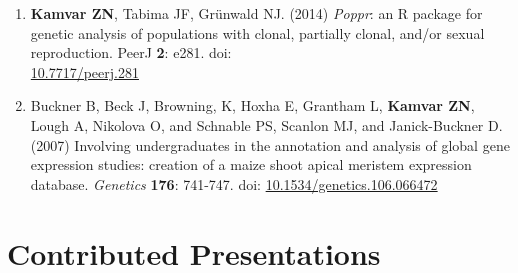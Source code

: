 \begin{enumerate}[leftmargin = 14pt]
	\vspace{3pt}

  \item \textbf{Kamvar ZN}, Tabima JF, Gr\"unwald NJ. (2014) \textit{Poppr}: an
	R package for genetic analysis of populations with clonal, partially clonal,
	and/or sexual reproduction. PeerJ \textbf{2}: e281. doi: \\
	\href{http://doi.org/10.7717/peerj.281}{10.7717/peerj.281}

	\vspace{3pt}

	\item Buckner B, Beck J, Browning, K, Hoxha E, Grantham L, \textbf{Kamvar
	ZN}, Lough A, Nikolova O, and Schnable PS, Scanlon MJ, and Janick-Buckner D.
	(2007) Involving undergraduates in the annotation and analysis of global
	gene expression studies: creation of a maize shoot apical meristem
	expression database. \textit{Genetics}
	\textbf{176}: 741-747. doi:
	\href{http://doi.org/10.1534/genetics.106.066472}{10.1534/genetics.106.066472}

\end{enumerate}





\section{Contributed Presentations}


